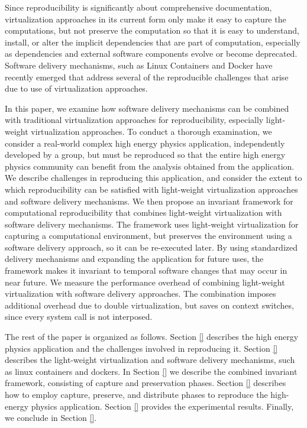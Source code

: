 Since reproducibility is significantly about comprehensive documentation, virtualization approaches in its current form only make it easy to capture the computations, but not preserve the computation so that it is easy to understand, install, or alter the implicit dependencies that are part of computation, especially as dependencies and external software components evolve or become deprecated.
Software delivery mechanisms, such as Linux Containers and Docker have recently emerged that address several of the reproducible challenges that arise due to use of virtualization approaches. 

In this paper, we examine how software delivery mechanisms can be combined with traditional virtualization approaches for reproducibility, especially light-weight virtualization approaches. To conduct a thorough examination, we consider a real-world complex high energy physics application, independently developed by a group, but must be reproduced  so that the entire high energy physics community can benefit from the analysis obtained from the application. 
We describe challenges in reproducing this application, and consider the extent to which reproducibility can be satisfied with light-weight virtualization approaches and software delivery mechanisms. We then propose an invariant framework for computational reproducibility that combines light-weight virtualization with software delivery mechanisms. The framework uses light-weight virtualization for capturing a computational environment, but preserves the environment using a software delivery approach, so it can be re-executed later. By using standardized delivery mechanisms and expanding the application for future uses, the framework makes it invariant to temporal software changes that may occur in near future. We measure the performance overhead of combining light-weight virtualization with software delivery approaches. The combination imposes additional overhead due to double virtualization, but saves on context switches, since every system call is not interposed. 

The rest of the paper is organized as follows. Section \ref{} describes the high energy physics application and the challenges involved in reproducing it. 
Section \ref{} describes the light-weight virtualization and software delivery mechanisms, such as linux containers and dockers. 
In Section \ref{} we describe the combined invariant framework, consisting of capture and preservation phases. 
Section \ref{} describes how to employ capture, preserve, and distribute phases to reproduce the high-energy physics application.
Section \ref{} provides the experimental results. Finally, we conclude in Section \ref{}. 


